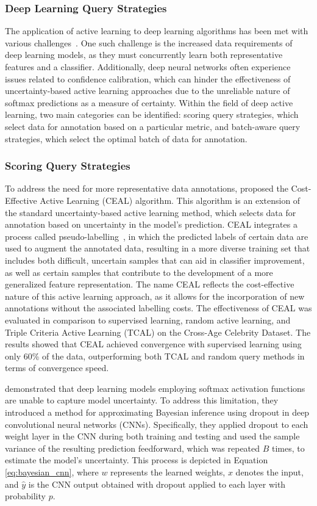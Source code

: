 \subsubsection{Deep Learning Query Strategies}
The application of active learning to deep learning algorithms has been met with various challenges~\citep{ren2021survey}. One such challenge is the increased data requirements of deep learning models, as they must concurrently learn both representative features and a classifier. Additionally, deep neural networks often experience issues related to confidence calibration, which can hinder the effectiveness of uncertainty-based active learning approaches due to the unreliable nature of softmax predictions as a measure of certainty. Within the field of deep active learning, two main categories can be identified: scoring query strategies, which select data for annotation based on a particular metric, and batch-aware query strategies, which select the optimal batch of data for annotation.

\subsubsection{Scoring Query Strategies}
To address the need for more representative data annotations, \cite{wang2017cost} proposed the Cost-Effective Active Learning (CEAL) algorithm. This algorithm is an extension of the standard uncertainty-based active learning method, which selects data for annotation based on uncertainty in the model's prediction. CEAL integrates a process called pseudo-labelling~\citep{lee2013pseudo}, in which the predicted labels of certain data are used to augment the annotated data, resulting in a more diverse training set that includes both difficult, uncertain samples that can aid in classifier improvement, as well as certain samples that contribute to the development of a more generalized feature representation. The name CEAL reflects the cost-effective nature of this active learning approach, as it allows for the incorporation of new annotations without the associated labelling costs. The effectiveness of CEAL was evaluated in comparison to supervised learning, random active learning, and Triple Criteria Active Learning (TCAL)\citep{demir2015novel} on the Cross-Age Celebrity Dataset\citep{chen2014cross}. The results showed that CEAL achieved convergence with supervised learning using only 60\% of the data, outperforming both TCAL and random query methods in terms of convergence speed.

\cite{gal2016dropout} demonstrated that deep learning models employing softmax activation functions are unable to capture model uncertainty. To address this limitation, they introduced a method for approximating Bayesian inference using dropout in deep convolutional neural networks (CNNs). Specifically, they applied dropout to each weight layer in the CNN during both training and testing and used the sample variance of the resulting prediction feedforward, which was repeated $B$ times, to estimate the model's uncertainty. This process is depicted in Equation \ref{eq:bayesian_cnn}, where $w$ represents the learned weights, $x$ denotes the input, and $\widehat{y}$ is the CNN output obtained with dropout applied to each layer with probability $p$.

